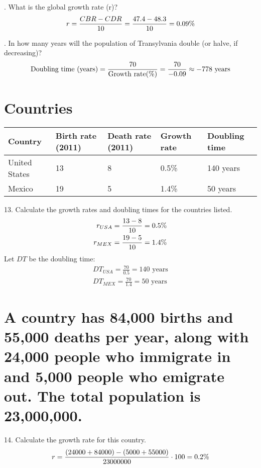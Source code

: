 \documentclass[11pt]{article}
\newcommand*{\vs}{\vspace{1cm}}
\newcommand*{\next}{\noindent}
\newcommand*{\set}{\setcounter{equation}{0}}
\begin{document}
\vs
\next
11. What is the global growth rate (r)?
\begin{align}
    \set
    r=\frac{CBR-CDR}{10}=\frac{47.4-48.3}{10}=0.09\%
\end{align}

\vs
\next
12. In how many years will the population of Transylvania double (or halve, if decreasing)?
\begin{align}
    \set
    \text{Doubling time (years)}=\frac{70}{\text{Growth rate(\%)}}=\frac{70}{-0.09}\approx -778\,\,\text{years}
\end{align}

\section{Countries}

\begin{flushleft}
    \begin{table}[h]
        \begin{tabular}{|l|l|l|l|l|} %
        \hline
        Country & Birth rate (2011) & Death rate (2011) & Growth rate & Doubling time\\ \hline
        United States & 13 & 8& 0.5\% & 140 years\\ \hline
        Mexico & 19 & 5 & 1.4\% & 50 years\\
        \hline
        \end{tabular}
    \end{table}
\end{flushleft}
13. Calculate the growth rates and doubling times for the countries listed.
\begin{align}
    \set
    r_{USA}&=\frac{13-8}{10}=0.5\%\\
    r_{MEX}&=\frac{19-5}{10}=1.4\%
\end{align}
Let $DT$ be the doubling time:
\begin{align}
    DT_{USA}=\frac{70}{0.5}=140\,\,\text{years}\\
    DT_{MEX}=\frac{70}{1.4}=50\,\,\text{years}
\end{align}

\section{A country has 84,000 births and 55,000 deaths per year, along with 24,000 people who immigrate in and 5,000 people who emigrate out. The total population is 23,000,000.}
14. Calculate the growth rate for this country.
\begin{align}
    \set
    r=\frac{(24000+84000)-(5000+55000)}{23000000}\cdot 100=0.2\%
\end{align}
\end{document}
